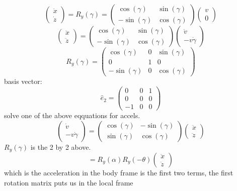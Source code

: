 \documentclass{article}
\begin{document}
\[\begin{pmatrix}\dot{x}\\\dot{z}\end{pmatrix}=R_y(\gamma)=\begin{pmatrix}\cos(\gamma)&\sin(\gamma)\\-\sin(\gamma)&\cos(\gamma)\end{pmatrix}\begin{pmatrix}v\\0\end{pmatrix}\]
\[\begin{pmatrix}\ddot{x}\\\ddot{z}\end{pmatrix}=\begin{pmatrix}\cos(\gamma)&\sin(\gamma)\\-\sin(\gamma)&\cos(\gamma)\end{pmatrix}\begin{pmatrix}\dot{v}\\-v\dot{\gamma}\end{pmatrix}\]
\[R_y(\gamma)=\begin{pmatrix}\cos(\gamma)&0&\sin(\gamma)\\0&1&0\\-\sin(\gamma)&0&\cos(\gamma)\end{pmatrix}\]
basis vector:
\[\hat{e}_2=\begin{pmatrix}0&0&1\\0&0&0\\-1&0&0\end{pmatrix}\]
solve one of the above eqquations for accels.
\[\begin{pmatrix}\dot{v}\\-v\dot{\gamma}\end{pmatrix}=\begin{pmatrix}\cos(\gamma)&-\sin(\gamma)\\\sin(\gamma)&\cos(\gamma)\end{pmatrix}\begin{pmatrix}\ddot{x}\\\ddot{z}\end{pmatrix}\]
$R_y(\gamma)$ is the 2 by 2 above.\\
\[=R_y(\alpha)R_y(-\theta)\begin{pmatrix}\ddot{x}\\\ddot{z}\end{pmatrix}\]
which is the acceleration in the body frame is the first two terms, the first rotation matrix puts us in the local frame
\end{document}
